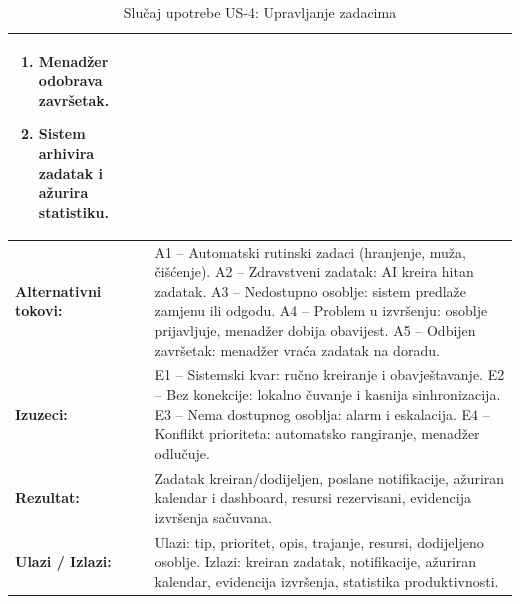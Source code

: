 \documentclass{article}
\begin{document}
\begin{table}[H]
\begin{tabular}{|>{\raggedright}p{3.5cm}|>{\raggedright\arraybackslash}p{11cm}|}
\begin{enumerate}[leftmargin=*, nosep]
    \item Menadžer odobrava završetak.
    \item Sistem arhivira zadatak i ažurira statistiku.
\end{enumerate} \\
\hline
\textbf{Alternativni tokovi:} &
A1 – Automatski rutinski zadaci (hranjenje, muža, čišćenje).  
A2 – Zdravstveni zadatak: AI kreira hitan zadatak.  
A3 – Nedostupno osoblje: sistem predlaže zamjenu ili odgodu.  
A4 – Problem u izvršenju: osoblje prijavljuje, menadžer dobija obavijest.  
A5 – Odbijen završetak: menadžer vraća zadatak na doradu. \\
\hline
\textbf{Izuzeci:} & 
E1 – Sistemski kvar: ručno kreiranje i obavještavanje.  
E2 – Bez konekcije: lokalno čuvanje i kasnija sinhronizacija.  
E3 – Nema dostupnog osoblja: alarm i eskalacija.  
E4 – Konflikt prioriteta: automatsko rangiranje, menadžer odlučuje. \\
\hline
\textbf{Rezultat:} & Zadatak kreiran/dodijeljen, poslane notifikacije, ažuriran kalendar i dashboard, resursi rezervisani, evidencija izvršenja sačuvana. \\
\hline
\textbf{Ulazi / Izlazi:} & 
Ulazi: tip, prioritet, opis, trajanje, resursi, dodijeljeno osoblje.  
Izlazi: kreiran zadatak, notifikacije, ažuriran kalendar, evidencija izvršenja, statistika produktivnosti. \\
\hline
\end{tabular}
\caption{Slučaj upotrebe US-4: Upravljanje zadacima}
\end{table}


\pagebreak
\end{document}
